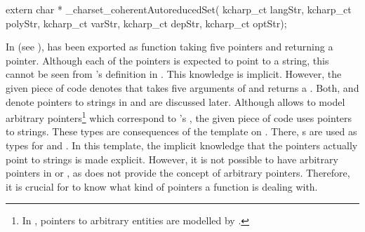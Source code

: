 \begin{mathematicaprogram}
extern char * _charset_coherentAutoreducedSet( kcharp_ct langStr, kcharp_ct polyStr, 
  kcharp_ct varStr, kcharp_ct depStr, kcharp_ct optStr);
\end{mathematicaprogram}

In \Aldor (see ), \exportedsymbol has been exported as function taking five pointers and returning a pointer. Although each of the pointers is expected to point to a string, this cannot be seen from \exportedsymbol's definition in \Aldor. This knowledge is implicit. However, the given piece of code denotes that \exportedsymbol takes five arguments of  and returns a . Both,  and  denote pointers to strings in \C and are discussed later. Although \C allows to model arbitrary pointers\footnote{In \C, pointers to arbitrary entities are modelled by .} which correspond to \Aldor's , the given piece of code uses pointers to strings. These types are consequences of the \MathLink template on . There, s are used as types for  and . In this template, the implicit knowledge that the pointers actually point to strings is made explicit. However, it is not possible to have arbitrary pointers in  or , as \Mathematica does not provide the concept of arbitrary pointers. Therefore, it is crucial for \MathLink to know what kind of pointers a function is dealing with.

